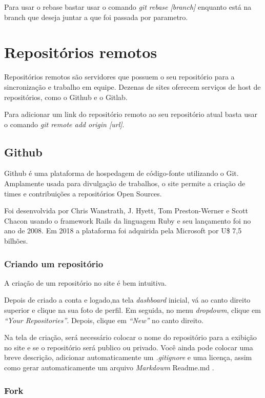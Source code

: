 \documentclass[]{article}
\begin{document}
Para usar o rebase bastar usar o comando \textit{git rebase [branch]} enquanto está na branch que deseja juntar a que foi passada por parametro.


\section{Repositórios remotos}

Repositórios remotos são servidores que possuem o seu repositório para a sincronização e trabalho em equipe.
 Dezenas de sites oferecem serviços de host de repositórios, como o Github e o Gitlab.
 
 Para adicionar um link do repositório remoto ao seu repositório atual basta usar o comando \textit{git remote add origin [url]}.
 \subsection*{Github}
Github é uma plataforma de hospedagem de código-fonte utilizando o Git.
Amplamente usada para divulgação de trabalhos, o site permite a criação de times e contribuições a repositórios Open Sources.

Foi desenvolvida por Chris Wanstrath, J. Hyett, Tom Preston-Werner e Scott Chacon usando o framework Rails da linguagem Ruby e seu lançamento foi no ano de 2008.
Em 2018 a plataforma foi adquirida pela Microsoft por U\$ 7,5 bilhões.
\subsubsection*{Criando um repositório}
A criação de um repositório no site é bem intuitiva.

Depois de criado a conta e logado,na tela \textit{dashboard} inicial, vá ao canto direito superior e clique na sua foto de perfil.
Em seguida, no menu \textit{dropdowm}, clique em \textit{``Your Repositories''}.
Depois, clique em \textit{``New''} no canto direito.

Na tela de criação, será necessário colocar o nome do repositório para a exibição no site e se o repositório será publico ou privado.
Você ainda pode colocar uma breve descrição, adicionar automaticamente um \textit{.gitignore} e uma licença, assim como gerar automaticamente um arquivo \textit{Markdowm} Readme.md .

\subsubsection*{Fork}
\end{document}
